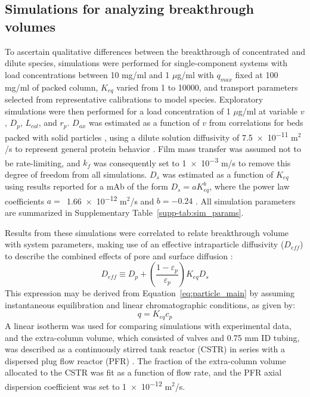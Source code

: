 \documentclass[preprint,review,12pt]{elsarticle}
\begin{document}
    \subsection{Simulations for analyzing breakthrough volumes} \label{ssec:sims_explor}
        To ascertain qualitative differences between the breakthrough of concentrated and dilute species, simulations were performed for single-component systems with load concentrations between 10 mg/ml and 1 $\mu$g/ml with $q_{max}$ fixed at  100 mg/ml of packed column, $K_{eq}$ varied from 1 to 10000, and transport parameters selected from representative calibrations to model species. Exploratory simulations were then performed for a load concentration of 1 $\mu$g/ml at variable $v$, $D_p$, $L_{col}$, and $r_p$. $D_{ax}$ was estimated as a function of $v$ from correlations for beds packed with solid particles \cite{Han1985}, using a dilute solution diffusivity of \num{7.5e-11} m$^2$/s to represent general protein behavior \cite{Young1980}. Film mass transfer was assumed not to be rate-limiting, and $k_f$ was consequently set to \num{1e-3} m/s to remove this degree of freedom from all simulations. $D_s$ was estimated as a function of $K_{eq}$ using results reported for a mAb of the form $D_s = a K_{eq}^b$, where the power law coefficients $a =$~\num{1.66e-12} m$^2$/s and $b = -0.24$ \cite{Khanal7004}. All simulation parameters are summarized in Supplementary Table~\ref{supp-tab:sim_params}.


        Results from these simulations were correlated to relate breakthrough volume with system parameters, making use of an effective intraparticle diffusivity ($D_{eff}$) to describe the combined effects of pore and surface diffusion \cite{Yoshida1994}:
        \begin{equation} \label{eq:d_eff}
            D_{eff} \equiv D_p + \left( \frac{1 - \varepsilon_p}{\varepsilon_p} \right) K_{eq} D_s
        \end{equation}
        This expression may be derived from Equation~\ref{eq:particle_main} by assuming instantaneous equilibration and linear chromatographic conditions, as given by:
        \begin{equation} \label{eq:linear_ss}
            q = K_{eq} c_p
        \end{equation}
        A linear isotherm was used for comparing simulations with experimental data, and the extra-column volume, which consisted of valves and 0.75 mm ID tubing, was described as a continuously stirred tank reactor (CSTR) in series with a dispersed plug flow reactor (PFR) \cite{Kumar2015}. The fraction of the extra-column volume allocated to the CSTR was fit as a function of flow rate, and the PFR axial dispersion coefficient was set to \num{1e-12} m$^2$/s.
\end{document}
